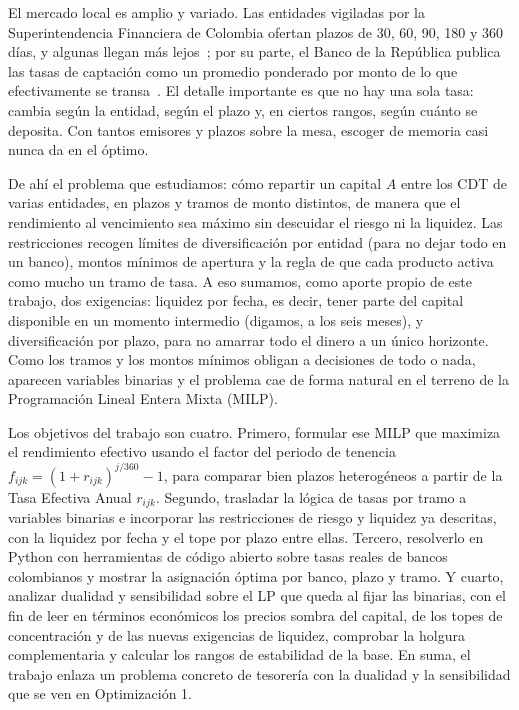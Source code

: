 \documentclass[11pt,a4paper]{article}
\begin{document}
El mercado local es amplio y variado. Las entidades vigiladas por la Superintendencia
Financiera de Colombia ofertan plazos de 30, 60, 90, 180 y 360 días, y algunas llegan más
lejos~\citep{sfc_portal}; por su parte, el Banco de la República publica las tasas de captación
como un promedio ponderado por monto de lo que efectivamente se transa~\citep{banrep_tasas}. El
detalle importante es que no hay una sola tasa: cambia según la entidad, según el plazo y, en
ciertos rangos, según cuánto se deposita. Con tantos emisores y plazos sobre la mesa, escoger de memoria casi nunca da en
el óptimo.

De ahí el problema que estudiamos: cómo repartir un capital $A$ entre los CDT de varias
entidades, en plazos y tramos de monto distintos, de manera que el rendimiento al vencimiento
sea máximo sin descuidar el riesgo ni la liquidez. Las restricciones recogen límites de
diversificación por entidad (para no dejar todo en un banco), montos mínimos de apertura y la
regla de que cada producto activa como mucho un tramo de tasa. A eso sumamos, como aporte propio de
este trabajo, dos exigencias: liquidez por fecha, es decir, tener parte del capital
disponible en un momento intermedio (digamos, a los seis meses), y diversificación por plazo,
para no amarrar todo el dinero a un único horizonte. Como los tramos y los montos mínimos
obligan a decisiones de todo o nada, aparecen variables binarias y el problema cae de forma
natural en el terreno de la Programación Lineal Entera Mixta (MILP).

Los objetivos del trabajo son cuatro. Primero, formular ese MILP que maximiza el rendimiento
efectivo usando el factor del periodo de tenencia $f_{ijk} = (1 + r_{ijk})^{j/360} - 1$, para
comparar bien plazos heterogéneos a partir de la Tasa Efectiva Anual $r_{ijk}$. Segundo,
trasladar la lógica de tasas por tramo a variables binarias e incorporar las restricciones de
riesgo y liquidez ya descritas, con la liquidez por fecha y el tope por plazo entre ellas.
Tercero, resolverlo en Python con herramientas de código abierto sobre tasas reales de bancos
colombianos y mostrar la asignación óptima por banco, plazo y tramo. Y cuarto, analizar
dualidad y sensibilidad sobre el LP que queda al fijar las binarias, con el fin de leer en
términos económicos los precios sombra del capital, de los topes de concentración y de las
nuevas exigencias de liquidez, comprobar la holgura complementaria y calcular los rangos de
estabilidad de la base. En suma, el trabajo enlaza un problema concreto de tesorería con la
dualidad y la sensibilidad que se ven en Optimización 1.
\end{document}
